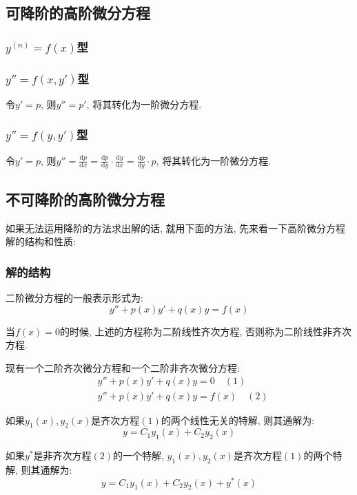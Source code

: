 \subsection{可降阶的高阶微分方程}
\subsubsection{$ y^{(n)}=f(x) $型}
\subsubsection{$ y''=f(x,y') $型}
令$ y'=p $, 则$ y''=p' $, 将其转化为一阶微分方程.
\subsubsection{$ y''=f(y,y') $型}
令$ y'=p $, 则$ y''=\frac{\mathrm{d}p}{\mathrm{d}x}=\frac{\mathrm{d}p}{\mathrm{d}y}\cdot \frac{\mathrm{d}y}{\mathrm{d}x}=\frac{\mathrm{d}p}{\mathrm{d}y}\cdot p $, 将其转化为一阶微分方程.
\subsection{不可降阶的高阶微分方程}
如果无法运用降阶的方法求出解的话, 就用下面的方法, 先来看一下高阶微分方程解的结构和性质:
\subsubsection{解的结构}
二阶微分方程的一般表示形式为:
\begin{equation*}
    y''+p(x)y'+q(x)y=f(x)
\end{equation*}\par
当$ f(x)=0 $的时候, 上述的方程称为二阶线性齐次方程, 否则称为二阶线性非齐次方程.\par 现有一个二阶齐次微分方程和一个二阶非齐次微分方程:
\begin{equation*}
    \begin{aligned}
         & y''+p(x)y'+q(x)y=0 \quad (1)    \\
         & y''+p(x)y'+q(x)y=f(x) \quad (2)
    \end{aligned}
\end{equation*}
\par \vspace{.5em}
如果$ y_{1}(x),y_{2}(x) $是齐次方程$ (1) $的两个线性无关的特解, 则其通解为:
\begin{equation*}
    y=C_{1}y_{1}(x)+C_{2}y_{2}(x)
\end{equation*}
\par \vspace{.5em}
如果$ y^{*} $是非齐次方程$ (2) $的一个特解, $ y_{1}(x),y_{2}(x) $是齐次方程$ (1) $的两个特解, 则其通解为:
\begin{equation*}
    y=C_{1}y_{1}(x)+C_{2}y_{2}(x)+y^{*}(x)
\end{equation*}
